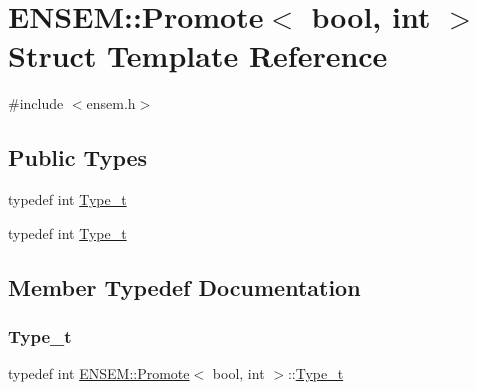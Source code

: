 \hypertarget{structENSEM_1_1Promote_3_01bool_00_01int_01_4}{}\section{E\+N\+S\+EM\+:\+:Promote$<$ bool, int $>$ Struct Template Reference}
\label{structENSEM_1_1Promote_3_01bool_00_01int_01_4}


{\ttfamily \#include $<$ensem.\+h$>$}

\subsection*{Public Types}
\begin{DoxyCompactItemize}
\item 
typedef int \mbox{\hyperlink{structENSEM_1_1Promote_3_01bool_00_01int_01_4_a99e4da6ec7e0f07a99dc32a1da962371}{Type\+\_\+t}}
\item 
typedef int \mbox{\hyperlink{structENSEM_1_1Promote_3_01bool_00_01int_01_4_a99e4da6ec7e0f07a99dc32a1da962371}{Type\+\_\+t}}
\end{DoxyCompactItemize}


\subsection{Member Typedef Documentation}
\mbox{\label{structENSEM_1_1Promote_3_01bool_00_01int_01_4_a99e4da6ec7e0f07a99dc32a1da962371}} 
\subsubsection{\texorpdfstring{Type\_t}{Type\_t}\hspace{0.1cm}{\footnotesize\ttfamily [1/2]}}
{\footnotesize\ttfamily typedef int \mbox{\hyperlink{structENSEM_1_1Promote}{E\+N\+S\+E\+M\+::\+Promote}}$<$ bool, int $>$\+::\mbox{\hyperlink{structENSEM_1_1Promote_3_01bool_00_01int_01_4_a99e4da6ec7e0f07a99dc32a1da962371}{Type\+\_\+t}}}

\mbox{\label{structENSEM_1_1Promote_3_01bool_00_01int_01_4_a99e4da6ec7e0f07a99dc32a1da962371}} 
